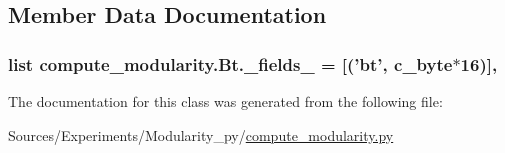 \subsection{Member Data Documentation}
\hypertarget{classcompute__modularity_1_1_bt_a67e24ec41d56d564d3c67e265cb9a4c3}{
\subsubsection[{\+\_\+fields\+\_\+}]{\setlength{\rightskip}{0pt plus 5cm}list compute\+\_\+modularity.\+Bt.\+\_\+fields\+\_\+ = \mbox{[}('bt', c\+\_\+byte$\ast$16)\mbox{]}\hspace{0.3cm}{\ttfamily [static]}, {\ttfamily [private]}}}\label{classcompute__modularity_1_1_bt_a67e24ec41d56d564d3c67e265cb9a4c3}


The documentation for this class was generated from the following file\+:\begin{DoxyCompactItemize}
\item 
Sources/\+Experiments/\+Modularity\+\_\+py/\hyperlink{compute__modularity_8py}{compute\+\_\+modularity.\+py}\end{DoxyCompactItemize}
